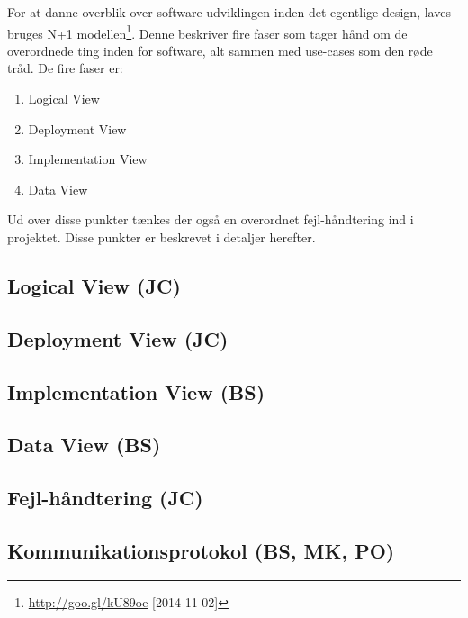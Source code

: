 For at danne overblik over software-udviklingen inden det egentlige design, laves bruges N+1 modellen\footnote{\url{http://goo.gl/kU89oe} [2014-11-02]}.
Denne beskriver fire faser som tager hånd om de overordnede ting inden for software, alt sammen med use-cases som den røde tråd.
De fire faser er:

\begin{enumerate}
	\item Logical View
	\item Deployment View
	\item Implementation View
	\item Data View
\end{enumerate}

Ud over disse punkter tænkes der også en overordnet fejl-håndtering ind i projektet. Disse punkter er beskrevet i detaljer herefter.

\subsection{Logical View (JC)}


\clearpage
\subsection{Deployment View (JC)}



\subsection{Implementation View (BS)}


\subsection{Data View (BS)}


\subsection{Fejl-håndtering (JC)}


%

\subsection{Kommunikationsprotokol (BS, MK, PO)}

